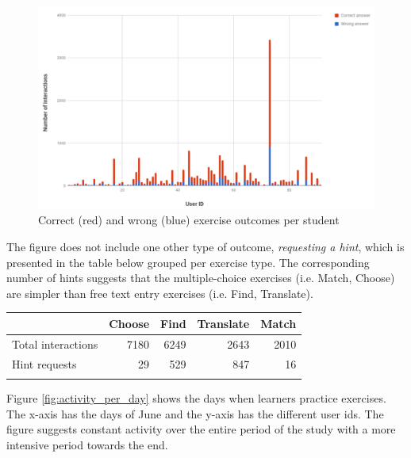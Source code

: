   \begin{figure}[h!]
  \centering
    \includegraphics[width=0.9\columnwidth]{figures/exercise_interactions_count.png}
    \caption{Correct (red) and wrong (blue) exercise outcomes per student}
    \label{fig:ex_interactions}
  \end{figure}

The figure does not include one other type of outcome, {\em requesting a hint}, which is presented in the table below grouped per exercise type. The corresponding number of hints suggests that the multiple-choice exercises (i.e. Match, Choose) are simpler than free text entry exercises (i.e. Find, Translate).

\begin{tabular}{lrrrr}
                      & Choose  & Find & Translate & Match \\ \hline
  Total interactions  & 7180    & 6249 & 2643      & 2010\\
  Hint requests       & 29      & 529  & 847       & 16 \\ \hline
  \label{tab:hints_per_ex_type}
\end{tabular}

Figure \ref{fig:activity_per_day} shows the days when learners practice exercises. The x-axis has the days of June and the y-axis has the different user ids. The figure suggests constant activity over the entire period of the study with a more intensive period towards the end.

